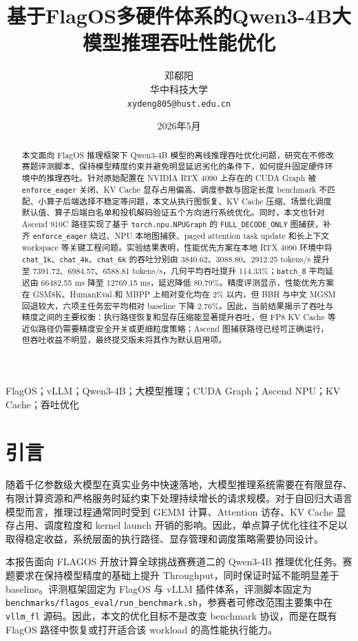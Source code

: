 \documentclass[UTF8,10.5pt]{ctexart}
\title{\heiti 基于FlagOS多硬件体系的Qwen3-4B大模型推理吞吐性能优化}
\author{邓郗阳\\华中科技大学\\\texttt{xydeng805@hust.edu.cn}}
\date{2026年5月}
\newcommand{\code}[1]{\texttt{#1}}
\begin{document}
\maketitle

\begin{abstract}
本文面向 FlagOS 推理框架下 Qwen3-4B 模型的离线推理吞吐优化问题，研究在不修改赛题评测脚本、保持模型精度约束并避免明显延迟劣化的条件下，如何提升固定硬件环境中的推理吞吐。针对原始配置在 NVIDIA RTX 4090 上存在的 CUDA Graph 被 \code{enforce\_eager} 关闭、KV Cache 显存占用偏高、调度参数与固定长度 benchmark 不匹配、小算子后端选择不稳定等问题，本文从执行图恢复、KV Cache 压缩、场景化调度默认值、算子后端白名单和投机解码验证五个方向进行系统优化。同时，本文也针对 Ascend 910C 路径实现了基于 \code{torch.npu.NPUGraph} 的 \code{FULL\_DECODE\_ONLY} 图捕获，补齐 \code{enforce\_eager} 绕过、NPU 本地图捕获、paged attention task update 和长上下文 workspace 等关键工程问题。实验结果表明，性能优先方案在本地 RTX 4090 环境中将 \code{chat\_1k}、\code{chat\_4k}、\code{chat\_6k} 的吞吐分别由 3840.62、3088.80、2912.25 tokens/s 提升至 7391.72、6984.57、6588.81 tokens/s，几何平均吞吐提升 114.33\%；\code{batch\_8} 平均延迟由 66482.55 ms 降至 12769.15 ms，延迟降低 80.79\%。精度评测显示，性能优先方案在 GSM8K、HumanEval 和 MBPP 上相对变化均在 2\% 以内，但 BBH 与中文 MGSM 回退较大，六项主任务宏平均相对 baseline 下降 2.76\%。因此，当前结果揭示了吞吐与精度之间的主要权衡：执行路径恢复和显存压缩能显著提升吞吐，但 FP8 KV Cache 等近似路径仍需要精度安全开关或更细粒度策略；Ascend 图捕获路径已经可正确运行，但吞吐收益不明显，最终提交版未将其作为默认启用项。
\end{abstract}

FlagOS；vLLM；Qwen3-4B；大模型推理；CUDA Graph；Ascend NPU；KV Cache；吞吐优化

\section{引言}

随着千亿参数级大模型在真实业务中快速落地，大模型推理系统需要在有限显存、有限计算资源和严格服务时延约束下处理持续增长的请求规模。对于自回归大语言模型而言，推理过程通常同时受到 GEMM 计算、Attention 访存、KV Cache 显存占用、调度粒度和 kernel launch 开销的影响。因此，单点算子优化往往不足以取得稳定收益，系统层面的执行路径、显存管理和调度策略需要协同设计。

本报告面向 FLAGOS 开放计算全球挑战赛赛道二的 Qwen3-4B 推理优化任务。赛题要求在保持模型精度的基础上提升 Throughput，同时保证时延不能明显差于 baseline。评测框架固定为 FlagOS 与 vLLM 插件体系，评测脚本固定为 \code{benchmarks/flagos\_eval/run\_benchmark.sh}，参赛者可修改范围主要集中在 \code{vllm\_fl} 源码。因此，本文的优化目标不是改变 benchmark 协议，而是在既有 FlagOS 路径中恢复或打开适合该 workload 的高性能执行能力。
\end{document}
